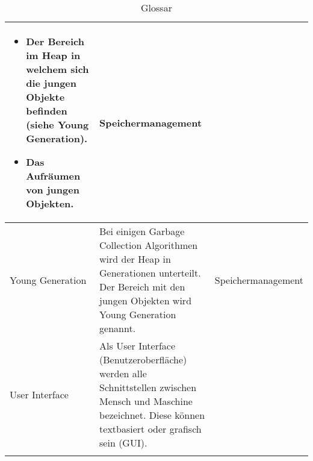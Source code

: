 \begin{longtable}{|p{4.5cm}|p{6cm}|p{4.1cm}|}
	\begin{itemize}
	\item Der Bereich im Heap in welchem sich die jungen Objekte befinden (siehe Young Generation).
	\item Das Aufräumen von jungen Objekten.
	\end{itemize}
	 & Speichermanagement\\\hline
  Young Generation &  Bei einigen Garbage Collection Algorithmen wird der Heap in Generationen unterteilt. Der Bereich mit den jungen Objekten wird Young Generation genannt.  & Speichermanagement \\\hline
User Interface &  Als User Interface (Benutzeroberfläche) werden alle Schnittstellen zwischen Mensch und Maschine bezeichnet. Diese können textbasiert oder grafisch sein (GUI). &  \\\hline
      \caption{Glossar}\\
  \end{longtable}


